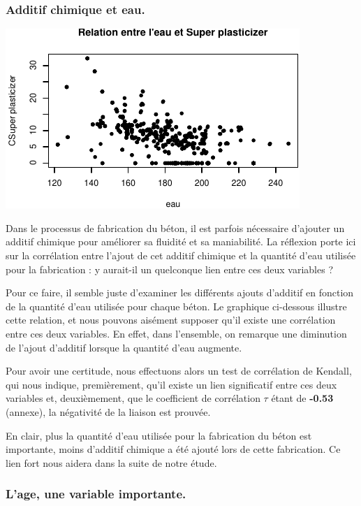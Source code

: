 \documentclass[
  12pt,
]{article}
\begin{document}
\subsubsection{Additif chimique et eau.}\label{additif-chimique-et-eau.}

\begin{center}\includegraphics{rmd_final_files/figure-latex/unnamed-chunk-11-1} \end{center}

Dans le processus de fabrication du béton, il est parfois nécessaire
d'ajouter un additif chimique pour améliorer sa fluidité et sa
maniabilité. La réflexion porte ici sur la corrélation entre l'ajout de
cet additif chimique et la quantité d'eau utilisée pour la fabrication :
y aurait-il un quelconque lien entre ces deux variables ?

Pour ce faire, il semble juste d'examiner les différents ajouts
d'additif en fonction de la quantité d'eau utilisée pour chaque béton.
Le graphique ci-dessous illustre cette relation, et nous pouvons
aisément supposer qu'il existe une corrélation entre ces deux variables.
En effet, dans l'ensemble, on remarque une diminution de l'ajout
d'additif lorsque la quantité d'eau augmente.

Pour avoir une certitude, nous effectuons alors un test de corrélation
de Kendall, qui nous indique, premièrement, qu'il existe un lien
significatif entre ces deux variables et, deuxièmement, que le
coefficient de corrélation \(\tau\) étant de \textbf{-0.53} (annexe), la
négativité de la liaison est prouvée.

En clair, plus la quantité d'eau utilisée pour la fabrication du béton
est importante, moins d'additif chimique a été ajouté lors de cette
fabrication. Ce lien fort nous aidera dans la suite de notre étude.

\subsubsection{L'age, une variable
importante.}\label{lage-une-variable-importante.}
\end{document}
